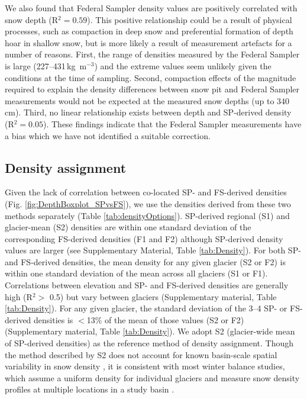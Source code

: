 \documentclass[twocolumn, letterpaper]{igs}
\begin{document}
We also found that Federal Sampler density values are positively correlated with snow depth (R$^2= 0.59$). This positive relationship could be a result of physical processes, such as compaction in deep snow and preferential formation of depth hoar in shallow snow, but is more likely a result of measurement artefacts for a number of reasons. First, the range of densities measured by the Federal Sampler is large (227--431\,kg\, m$^{-3}$) and the extreme values seem unlikely given the conditions at the time of sampling. Second, compaction effects of the magnitude required to explain the density differences between snow pit and Federal Sampler measurements would not be expected at the measured snow depths (up to 340\,cm). Third, no linear relationship exists between depth and SP-derived density (R$^2 = 0.05$). These findings indicate that the Federal Sampler measurements have a bias which we have not identified a suitable correction.

\subsection{Density assignment}

Given the lack of correlation between co-located SP- and FS-derived densities (Fig. \ref{fig:DepthBoxplot_SPvsFS}), we use the densities derived from these two methods separately (Table \ref{tab:densityOptions}). SP-derived regional (S1) and glacier-mean (S2) densities are within one standard deviation of the corresponding FS-derived densities (F1 and F2) although SP-derived density values are larger (see Supplementary Material, Table \ref{tab:Density}). For both SP- and FS-derived densities, the mean density for any given glacier (S2 or F2) is within one standard deviation of the mean across all glaciers (S1 or F1). Correlations between elevation and SP- and FS-derived densities are generally high (R$^2>$ 0.5) but vary between glaciers (Supplementary material, Table \ref{tab:Density}). For any given glacier, the standard deviation of the 3--4 SP- or FS-derived densities is $<$13\% of the mean of those values (S2 or F2) (Supplementary material, Table \ref{tab:Density}). We adopt S2 (glacier-wide mean of SP-derived densities) as the reference method of density assignment. Though the method described by S2 does not account for known basin-scale spatial variability in snow density \citep[e.g.][]{Wetlaufer2016}, it is consistent with most winter balance studies, which assume a uniform density for individual glaciers and measure snow density profiles at multiple locations in a study basin \citep[e.g.][]{Elder1991,McGrath2015,Cullen2017}. 
\end{document}
